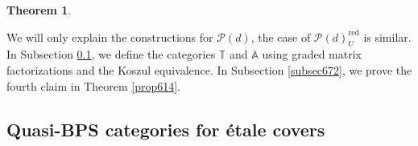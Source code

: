 \documentclass [11pt,oneside,a4paper,mathscr]{amsart}
\newtheorem{thm}{Theorem}[section]
\theoremstyle{definition}
\begin{document}
\begin{thm}
    
\end{thm}

We will only explain the constructions for $\mathscr{P}(d)$, the case of $\mathscr{P}(d)_U^{\mathrm{red}}$ is similar.
In Subsection \ref{subsec671}, we define the categories $\mathbb{T}$ and $\mathbb{A}$ using graded matrix factorizations and the Koszul equivalence. In Subsection \ref{subsec672}, we prove the fourth claim in Theorem \ref{prop614}. 






\subsection{Quasi-BPS categories for étale covers}\label{subsec671}
\end{document}
